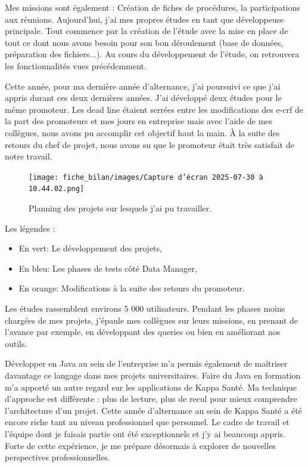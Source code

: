 Mes missions sont également : Création de fiches de procédures, la participations aux réunions. 
Aujourd’hui, j’ai mes propres études en tant que développeuse principale. Tout commence par la création de l’étude avec la mise en place de tout ce dont nous avons besoin pour son bon déroulement (base de données, préparation des fichiers...). Au cours du développement de l’étude, on retrouvera les fonctionnalités vues précédemment.
\vspace{0.5cm}

Cette année, pour ma dernière année d'alternance, j'ai poursuivi ce que j'ai appris durant ces deux dernières années. J'ai développé deux études pour le même promoteur. Les dead line étaient serrées entre les modifications des e-crf de la part des promoteurs et mes jours en entreprise mais avec l'aide de mes collègues, nous avons pu accomplir cet objectif haut la main. À la suite des retours du chef de projet, nous avons su que le promoteur était très satisfait de notre travail. 
\begin{figure}[H]
    \centering
    \texttt{[image: fiche\_bilan/images/Capture d’écran 2025-07-30 à 10.44.02.png]} 
    \caption{Planning des projets sur lesquels j'ai pu travailler.}
\end{figure}
Les légendes :
\begin{itemize}
    \item En vert: Le développement des projets,
    \item En bleu: Les phases de tests côté Data Manager,
    \item En orange: Modifications à la suite des retours du promoteur.
\end{itemize}
Les études rassemblent environs 5 000 utilisateurs. Pendant les phases moins chargées de mes projets, j'épaule mes collègues sur leurs missions, en prenant de l'avance par exemple, en développant des queries ou bien en améliorant nos outils.


\vspace{0.5cm}
Développer en Java au sein de l’entreprise m’a permis également de maîtriser davantage ce langage dans mes projets universitaires. Faire du Java en formation m’a apporté un autre regard sur les applications de Kappa Santé. Ma technique d’approche est différente : plus de lecture, plus de recul pour mieux comprendre l’architecture d’un projet. 
Cette année d’alternance au sein de Kappa Santé a été encore riche tant au niveau professionnel que personnel.
Le cadre de travail et l’équipe dont je faisais partie ont été exceptionnels et j’y ai beaucoup appris. 
Forte de cette expérience, je me prépare désormais à explorer de nouvelles perspectives professionnelles.

